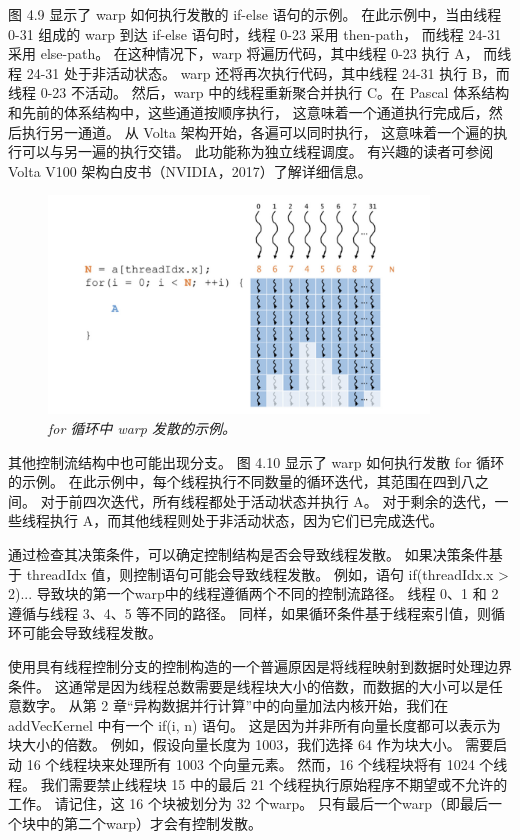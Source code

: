 图 4.9 显示了 warp 如何执行发散的 if-else 语句的示例。 
在此示例中，当由线程 0-31 组成的 warp 到达 if-else 语句时，线程 0-23 采用 then-path，
而线程 24-31 采用 else-path。 在这种情况下，warp 将遍历代码，其中线程 0-23 执行 A，
而线程 24-31 处于非活动状态。 warp 还将再次执行代码，其中线程 24-31 执行 B，而线程 0-23 不活动。 
然后，warp 中的线程重新聚合并执行 C。在 Pascal 体系结构和先前的体系结构中，这些通道按顺序执行，
这意味着一个通道执行完成后，然后执行另一通道。 从 Volta 架构开始，各遍可以同时执行，
这意味着一个遍的执行可以与另一遍的执行交错。 此功能称为独立线程调度。 
有兴趣的读者可参阅 Volta V100 架构白皮书（NVIDIA，2017）了解详细信息。

\begin{figure}[H]
	\centering
	\includegraphics[width=0.9\textwidth]{figs/F4.10.png}
	\caption{\textit{for 循环中 warp 发散的示例。}}
\end{figure}

其他控制流结构中也可能出现分支。 图 4.10 显示了 warp 如何执行发散 for 循环的示例。 
在此示例中，每个线程执行不同数量的循环迭代，其范围在四到八之间。 对于前四次迭代，所有线程都处于活动状态并执行 A。
对于剩余的迭代，一些线程执行 A，而其他线程则处于非活动状态，因为它们已完成迭代。

通过检查其决策条件，可以确定控制结构是否会导致线程发散。 如果决策条件基于 threadIdx 值，则控制语句可能会导致线程发散。 
例如，语句 if(threadIdx.x > 2){...} 导致块的第一个warp中的线程遵循两个不同的控制流路径。 
线程 0、1 和 2 遵循与线程 3、4、5 等不同的路径。 同样，如果循环条件基于线程索引值，则循环可能会导致线程发散。

使用具有线程控制分支的控制构造的一个普遍原因是将线程映射到数据时处理边界条件。 
这通常是因为线程总数需要是线程块大小的倍数，而数据的大小可以是任意数字。 
从第 2 章“异构数据并行计算”中的向量加法内核开始，我们在 addVecKernel 中有一个 if(i, n) 语句。 
这是因为并非所有向量长度都可以表示为块大小的倍数。 例如，假设向量长度为 1003，我们选择 64 作为块大小。 
需要启动 16 个线程块来处理所有 1003 个向量元素。 然而，16 个线程块将有 1024 个线程。 
我们需要禁止线程块 15 中的最后 21 个线程执行原始程序不期望或不允许的工作。 
请记住，这 16 个块被划分为 32 个warp。 只有最后一个warp（即最后一个块中的第二个warp）才会有控制发散。

